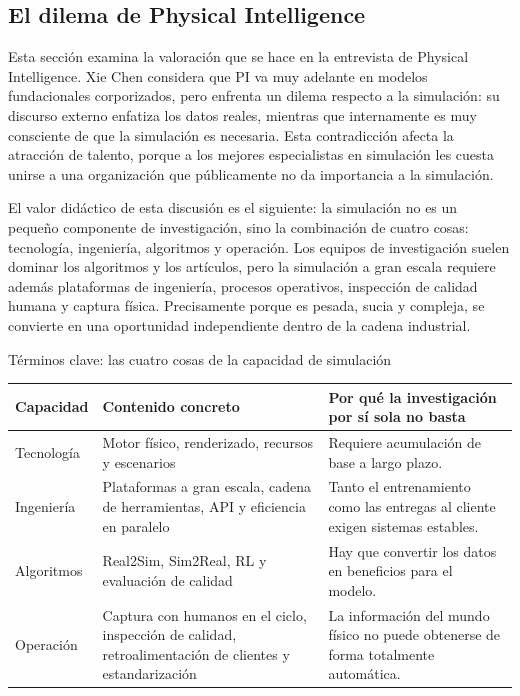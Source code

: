 \documentclass[a4paper]{article}
\begin{document}
\subsection{El dilema de Physical Intelligence}

Esta sección examina la valoración que se hace en la entrevista de Physical Intelligence. Xie Chen considera que PI va muy adelante en modelos fundacionales corporizados, pero enfrenta un dilema respecto a la simulación: su discurso externo enfatiza los datos reales, mientras que internamente es muy consciente de que la simulación es necesaria. Esta contradicción afecta la atracción de talento, porque a los mejores especialistas en simulación les cuesta unirse a una organización que públicamente no da importancia a la simulación.

El valor didáctico de esta discusión es el siguiente: la simulación no es un pequeño componente de investigación, sino la combinación de cuatro cosas: tecnología, ingeniería, algoritmos y operación. Los equipos de investigación suelen dominar los algoritmos y los artículos, pero la simulación a gran escala requiere además plataformas de ingeniería, procesos operativos, inspección de calidad humana y captura física. Precisamente porque es pesada, sucia y compleja, se convierte en una oportunidad independiente dentro de la cadena industrial.

\begin{knowledgebox}{Términos clave: las cuatro cosas de la capacidad de simulación}
\begin{tabularx}{\textwidth}{p{}p{}X}
\toprule
Capacidad & Contenido concreto & Por qué la investigación por sí sola no basta \\
\midrule
Tecnología & Motor físico, renderizado, recursos y escenarios & Requiere acumulación de base a largo plazo. \\
Ingeniería & Plataformas a gran escala, cadena de herramientas, API y eficiencia en paralelo & Tanto el entrenamiento como las entregas al cliente exigen sistemas estables. \\
Algoritmos & Real2Sim, Sim2Real, RL y evaluación de calidad & Hay que convertir los datos en beneficios para el modelo. \\
Operación & Captura con humanos en el ciclo, inspección de calidad, retroalimentación de clientes y estandarización & La información del mundo físico no puede obtenerse de forma totalmente automática. \\
\bottomrule
\end{tabularx}
\end{knowledgebox}
\end{document}
